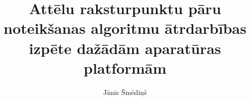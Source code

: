 \documentclass[magjistrs]{vea-diplomdarbs}
\title{Attēlu raksturpunktu pāru noteikšanas algoritmu ātrdarbības izpēte dažādām aparatūras platformām}
\author{Jānis Šmēdiņš}
\begin{document}
	\pagestyle{empty}
	
	\onehalfspacing %
	\tableofcontents\clearpage
	\sloppy %
	
	\renewcommand{\thelstlisting}{\thesection.\arabic{lstlisting}}
	
	
	
	
	\clearpage
	\pagestyle{plain} %
	
	
	
	\clearpage %
	\clearpage
	\clearpage
	\clearpage
	
	\clearpage
	
	\clearpage
	
	\clearpage
\end{document}
